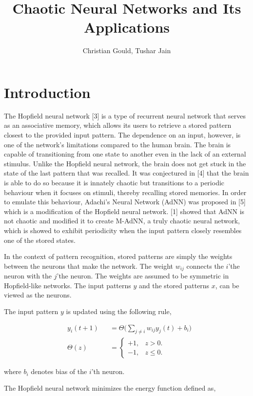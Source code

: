\documentclass[12pt, letterpaper]{article}
\title{Chaotic Neural Networks and Its Applications}
\author{Christian Gould, Tushar Jain}
\date{}
\begin{document}
\maketitle

\section*{Introduction}

The Hopfield neural network [3] is a type of recurrent neural network that serves as an associative memory, which allows its users to retrieve a stored pattern closest to the provided input pattern. The dependence on an input, however, is one of the network's limitations compared to the human brain. The brain is capable of transitioning from one state to another even in the lack of an external stimulus. Unlike the Hopfield neural network, the brain does not get stuck in the state of the last pattern that was recalled. It was conjectured in [4] that the brain is able to do so because it is innately chaotic but transitions to a periodic behaviour when it focuses on stimuli, thereby recalling stored memories. In order to emulate this behaviour, Adachi’s Neural Network (AdNN) was proposed in [5] which is a modification of the Hopfield neural network. [1] showed that AdNN is not chaotic and modified it to create M-AdNN, a truly chaotic neural network, which is showed to exhibit periodicity when the input pattern closely resembles one of the stored states.

In the context of pattern recognition, stored patterns are simply the weights between the neurons that make the network. The weight $w_{ij}$ connects the $i$'the neuron with the $j$'the neuron. The weights are assumed to be symmetric in Hopfield-like networks. The input patterns $y$ and the stored patterns $x$, can be viewed as the neurons.

The input pattern $y$ is updated using the following rule,

$$
\begin{aligned}
& y_i(t+1) &&= \Theta\big(\sum_{j \neq i} w_{ij}y_j(t) + b_i \big)\\
& \Theta(z) &&= \begin{cases}
  +1, & z > 0.\\
  -1, & z \le 0.
  \end{cases}
\end{aligned}
$$

where $b_i$ denotes bias of the $i$'th neuron.

The Hopfield neural network minimizes the energy function defined as,
\end{document}
